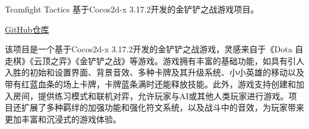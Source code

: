 \documentclass{beamer}
\newcommand{\hrefcol}[2]{\textcolor{cyan}{\href{#1}{#2}}}
\begin{document}

\begin{frame}[fragile]{Teamfight Tactics}
基于Cocos2d-x 3.17.2开发的金铲铲之战游戏项目。

\vspace{1em}

\hrefcol{https://github.com/MinmusLin/Teamfight_Tactics}{GitHub仓库}

\vspace{1em}

该项目是一个基于Cocos2d-x 3.17.2开发的金铲铲之战游戏，灵感来自于《Dota 自走棋》《云顶之弈》《金铲铲之战》等游戏。游戏拥有丰富的基础功能，如具有引人入胜的初始和设置界面、背景音效、多种卡牌及其升级系统、小小英雄的移动以及带有红蓝血条的场上卡牌，卡牌蓝条满时还能释放技能。此外，游戏支持创建和加入房间，提供练习模式和联机对弈，允许玩家与AI或其他人类玩家进行游戏。项目还扩展了多种羁绊的加强功能和强化符文系统，以及战斗中的音效，为玩家带来更加丰富和沉浸式的游戏体验。
\end{frame}

\end{document}
